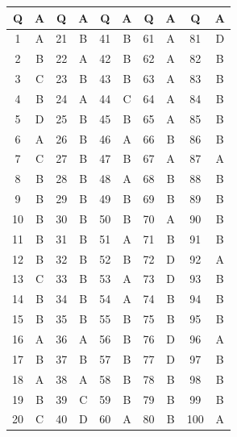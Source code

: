 \documentclass[11pt]{article}
\begin{document}
	\begin{center}
		\begin{tabular}{|c|c|c|c|c|c|c|c|c|c|}
			\hline
			Q & A & Q & A & Q & A & Q & A & Q & A \\
			\hline
			1 & A & 21 & B & 41 & B & 61 & A & 81 & D \\
			2 & B & 22 & A & 42 & B & 62 & A & 82 & B \\
			3 & C & 23 & B & 43 & B & 63 & A & 83 & B \\
			4 & B & 24 & A & 44 & C & 64 & A & 84 & B \\
			5 & D & 25 & B & 45 & B & 65 & A & 85 & B \\
			6 & A & 26 & B & 46 & A & 66 & B & 86 & B \\
			7 & C & 27 & B & 47 & B & 67 & A & 87 & A \\
			8 & B & 28 & B & 48 & A & 68 & B & 88 & B \\
			9 & B & 29 & B & 49 & B & 69 & B & 89 & B \\
			10 & B & 30 & B & 50 & B & 70 & A & 90 & B \\
			11 & B & 31 & B & 51 & A & 71 & B & 91 & B \\
			12 & B & 32 & B & 52 & B & 72 & D & 92 & A \\
			13 & C & 33 & B & 53 & A & 73 & D & 93 & B \\
			14 & B & 34 & B & 54 & A & 74 & B & 94 & B \\
			15 & B & 35 & B & 55 & B & 75 & B & 95 & B \\
			16 & A & 36 & A & 56 & B & 76 & D & 96 & A \\
			17 & B & 37 & B & 57 & B & 77 & D & 97 & B \\
			18 & A & 38 & A & 58 & B & 78 & B & 98 & B \\
			19 & B & 39 & C & 59 & B & 79 & B & 99 & B \\
			20 & C & 40 & D & 60 & A & 80 & B & 100 & A \\
			\hline
		\end{tabular}
	\end{center}
	
\end{document}
